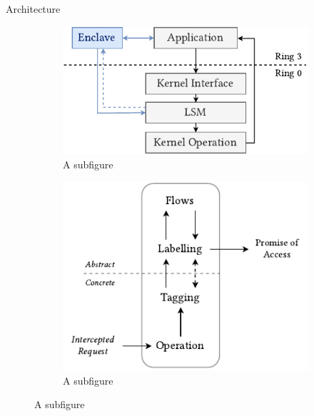\documentclass[xcolor=dvipsnames]{beamer}
\begin{document}
\begin{frame}{Architecture}

    \begin{figure}
        \centering
        \begin{subfigure}{.5\textwidth}
          \centering
          \includegraphics[width=.9\linewidth]{../figures/SGX-EnclaveIntegration-SoloActual.pdf}
          \vspace{5mm}
          \caption{A subfigure}
          \label{fig:sub1}
        \end{subfigure}%
        \begin{subfigure}{.5\textwidth}
          \centering
          \includegraphics[width=\linewidth]{../figures/IFCFlow-2.pdf}
          \vspace{5mm}
          \caption{A subfigure}
          \label{fig:sub2}
        \end{subfigure}
        \label{fig:test}
    \end{figure}

    
\end{frame}
\end{document}
